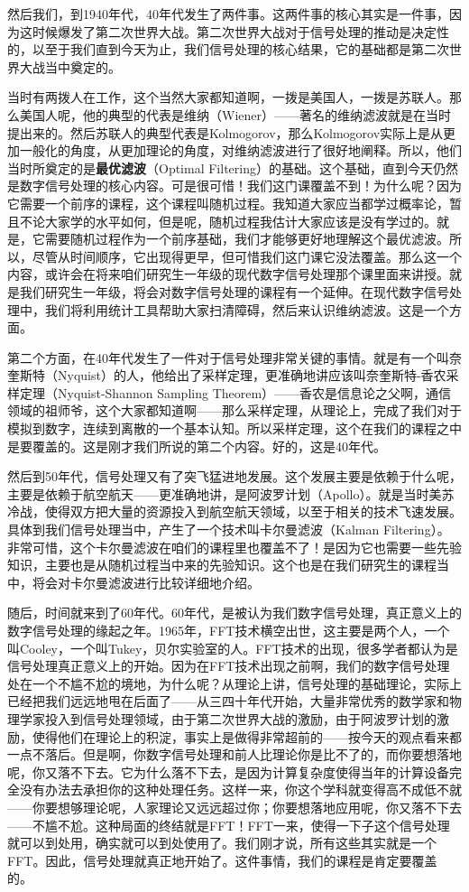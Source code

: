 \documentclass[a4paper,12pt]{article}
\begin{document}
然后我们，到1940年代，40年代发生了两件事。这两件事的核心其实是一件事，因为这时候爆发了第二次世界大战。第二次世界大战对于信号处理的推动是决定性的，以至于我们直到今天为止，我们信号处理的核心结果，它的基础都是第二次世界大战当中奠定的。


当时有两拨人在工作，这个当然大家都知道啊，一拨是美国人，一拨是苏联人。那么美国人呢，他的典型的代表是维纳（Wiener）——著名的维纳滤波就是在当时提出来的。然后苏联人的典型代表是Kolmogorov，那么Kolmogorov实际上是从更加一般化的角度，从更加理论的角度，对维纳滤波进行了很好地阐释。所以，他们当时所奠定的是\textbf{最优滤波}（Optimal Filtering）的基础。这个基础，直到今天仍然是数字信号处理的核心内容。可是很可惜！我们这门课覆盖不到！为什么呢？因为它需要一个前序的课程，这个课程叫随机过程。我知道大家应当都学过概率论，暂且不论大家学的水平如何，但是呢，随机过程我估计大家应该是没有学过的。就是，它需要随机过程作为一个前序基础，我们才能够更好地理解这个最优滤波。所以，尽管从时间顺序，它出现得更早，但可惜我们这门课它没法覆盖。那么这一个内容，或许会在将来咱们研究生一年级的现代数字信号处理那个课里面来讲授。就是我们研究生一年级，将会对数字信号处理的课程有一个延伸。在现代数字信号处理中，我们将利用统计工具帮助大家扫清障碍，然后来认识维纳滤波。这是一个方面。


第二个方面，在40年代发生了一件对于信号处理非常关键的事情。就是有一个叫奈奎斯特（Nyquist）的人，他给出了采样定理，更准确地讲应该叫奈奎斯特-香农采样定理（Nyquist-Shannon Sampling Theorem）——香农是信息论之父啊，通信领域的祖师爷，这个大家都知道啊——那么采样定理，从理论上，完成了我们对于模拟到数字，连续到离散的一个基本认知。所以采样定理，这个在我们的课程之中是要覆盖的。这是刚才我们所说的第二个内容。好的，这是40年代。



然后到50年代，信号处理又有了突飞猛进地发展。这个发展主要是依赖于什么呢，主要是依赖于航空航天——更准确地讲，是阿波罗计划（Apollo）。就是当时美苏冷战，使得双方把大量的资源投入到航空航天领域，以至于相关的技术飞速发展。具体到我们信号处理当中，产生了一个技术叫卡尔曼滤波（Kalman Filtering）。非常可惜，这个卡尔曼滤波在咱们的课程里也覆盖不了！是因为它也需要一些先验知识，主要也是从随机过程当中来的先验知识。这个也是在我们研究生的课程当中，将会对卡尔曼滤波进行比较详细地介绍。


随后，时间就来到了60年代。60年代，是被认为我们数字信号处理，真正意义上的数字信号处理的缘起之年。1965年，FFT技术横空出世，这主要是两个人，一个叫Cooley，一个叫Tukey，贝尔实验室的人。FFT技术的出现，很多学者都认为是信号处理真正意义上的开始。因为在FFT技术出现之前啊，我们的数字信号处理处在一个不尴不尬的境地，为什么呢？从理论上讲，信号处理的基础理论，实际上已经把我们远远地甩在后面了——从三四十年代开始，大量非常优秀的数学家和物理学家投入到信号处理领域，由于第二次世界大战的激励，由于阿波罗计划的激励，使得他们在理论上的积淀，事实上是做得非常超前的——按今天的观点看来都一点不落后。但是啊，你数字信号处理和前人比理论你是比不了的，而你要想落地呢，你又落不下去。它为什么落不下去，是因为计算复杂度使得当年的计算设备完全没有办法去承担你的这种处理任务。这样一来，你这个学科就变得高不成低不就——你要想够理论呢，人家理论又远远超过你；你要想落地应用呢，你又落不下去——不尴不尬。这种局面的终结就是FFT！FFT一来，使得一下子这个信号处理就可以到处用，确实就可以到处使用了。我们刚才说，所有这些其实就是一个FFT。因此，信号处理就真正地开始了。这件事情，我们的课程是肯定要覆盖的。
\end{document}
